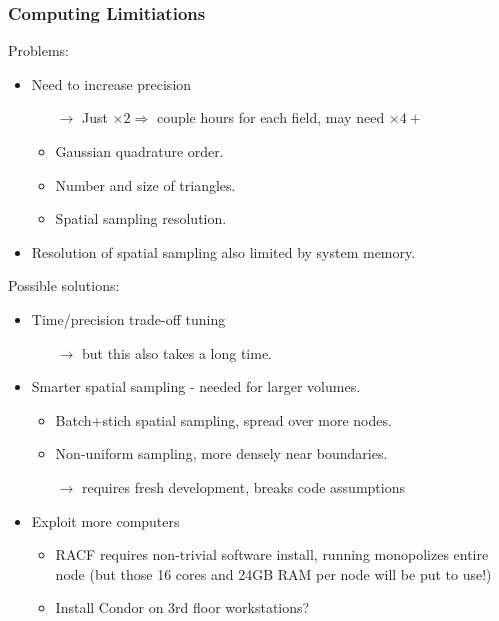 \documentclass[xcolor=dvipsnames]{beamer}
\begin{document}
\begin{frame}
  \frametitle{Computing Limitiations}
  Problems:
  \begin{itemize}\footnotesize
  \item Need to increase precision 
    \begin{itemize}\scriptsize
    \item[$\rightarrow$] Just $\times 2 \Rightarrow$ couple hours for each field, may need $\times 4+$
    \item Gaussian quadrature order.
    \item Number and size of triangles.
    \item Spatial sampling resolution.
    \end{itemize}
  \item Resolution of spatial sampling also limited by system memory.
  \end{itemize}
  Possible solutions:
  \begin{itemize}\footnotesize
  \item Time/precision trade-off tuning
    \begin{itemize}\scriptsize
    \item[$\rightarrow$] but this also takes a long time.
    \end{itemize}
  \item Smarter spatial sampling - needed for larger volumes.
    \begin{itemize}\scriptsize
    \item Batch+stich spatial sampling, spread over more nodes.
    \item Non-uniform sampling, more densely near boundaries.
    \item[$\rightarrow$] requires fresh development, breaks code assumptions
    \end{itemize}
  \item Exploit more computers
    \begin{itemize}\scriptsize
    \item RACF requires non-trivial software install, running
      monopolizes entire node (but those 16 cores and 24GB RAM per
      node will be put to use!)
    \item Install Condor on 3rd floor workstations?
    \end{itemize}
  \end{itemize}
\end{frame}
\end{document}
